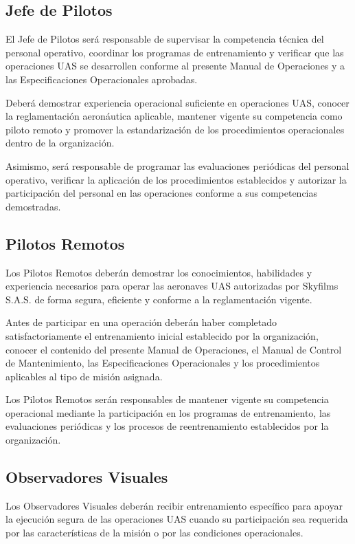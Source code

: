 \subsection{Jefe de Pilotos}

El Jefe de Pilotos será responsable de supervisar la competencia técnica del personal operativo, coordinar los programas de entrenamiento y verificar que las operaciones UAS se desarrollen conforme al presente Manual de Operaciones y a las Especificaciones Operacionales aprobadas.

Deberá demostrar experiencia operacional suficiente en operaciones UAS, conocer la reglamentación aeronáutica aplicable, mantener vigente su competencia como piloto remoto y promover la estandarización de los procedimientos operacionales dentro de la organización.

Asimismo, será responsable de programar las evaluaciones periódicas del personal operativo, verificar la aplicación de los procedimientos establecidos y autorizar la participación del personal en las operaciones conforme a sus competencias demostradas.

\subsection{Pilotos Remotos}

Los Pilotos Remotos deberán demostrar los conocimientos, habilidades y experiencia necesarios para operar las aeronaves UAS autorizadas por Skyfilms S.A.S. de forma segura, eficiente y conforme a la reglamentación vigente.

Antes de participar en una operación deberán haber completado satisfactoriamente el entrenamiento inicial establecido por la organización, conocer el contenido del presente Manual de Operaciones, el Manual de Control de Mantenimiento, las Especificaciones Operacionales y los procedimientos aplicables al tipo de misión asignada.

Los Pilotos Remotos serán responsables de mantener vigente su competencia operacional mediante la participación en los programas de entrenamiento, las evaluaciones periódicas y los procesos de reentrenamiento establecidos por la organización.
    
\subsection{Observadores Visuales}

Los Observadores Visuales deberán recibir entrenamiento específico para apoyar la ejecución segura de las operaciones UAS cuando su participación sea requerida por las características de la misión o por las condiciones operacionales.

